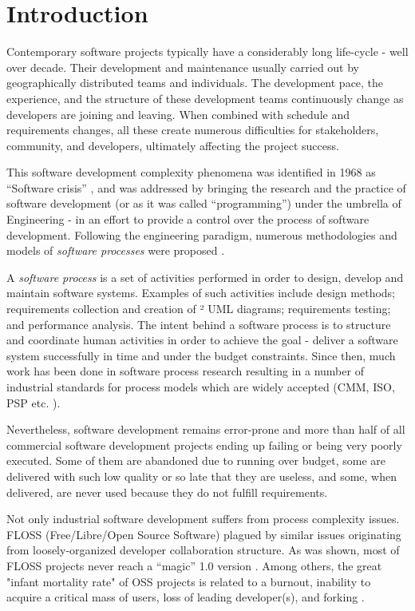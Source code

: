 \chapter{Introduction}
Contemporary software projects typically have a considerably long life-cycle - well over decade.
Their development and maintenance usually carried out by geographically distributed teams 
and individuals. The development pace, the experience, and the structure of these development 
teams continuously change as developers are joining and leaving. When combined with
schedule and requirements changes, all these create numerous difficulties 
for stakeholders, community, and developers, ultimately affecting the project success. 

This software development complexity phenomena was identified in 1968 as ``Software crisis'' \cite{crisis}, 
and was addressed by bringing the research and the practice of software development 
(or as it was called ``programming'') under the umbrella of Engineering  - in an effort to provide a 
control over the process of software development. 
Following the engineering paradigm, numerous methodologies and models of \textit{software processes}
were proposed \cite{citeulike:10002165}.

A \textit{software process} is a set of activities performed in order to design, develop and maintain 
software systems. Examples of such activities include design methods; requirements collection and creation of ²
UML diagrams; requirements testing; and performance analysis. 
The intent behind a software process is to structure and coordinate human activities in order to achieve 
the goal - deliver a software system successfully in time and under the budget constraints.
Since then, much work has been done in software process research resulting in a number of industrial standards for 
process models which are widely accepted (CMM, ISO, PSP etc. \cite{citeulike:5043104}). 

Nevertheless, software development remains error-prone and more than half of all commercial software development
projects ending up failing or being very poorly executed. Some of them are abandoned due to running over budget,
 some are delivered with such low quality or so late that they are useless, and some, when delivered, 
are never used because they do not fulfill requirements. 

Not only industrial software development suffers from process complexity issues. FLOSS (Free/Libre/Open Source Software)
plagued by similar issues originating from loosely-organized developer collaboration structure. 
As was shown, most of FLOSS projects never reach a ``magic'' 1.0 version \cite{citeulike:12480029}. 
Among others, the great "infant mortality rate" of OSS projects is related to a burnout, inability to acquire a critical
mass of users, loss of leading developer(s), and forking \cite{richter2007critique}.

